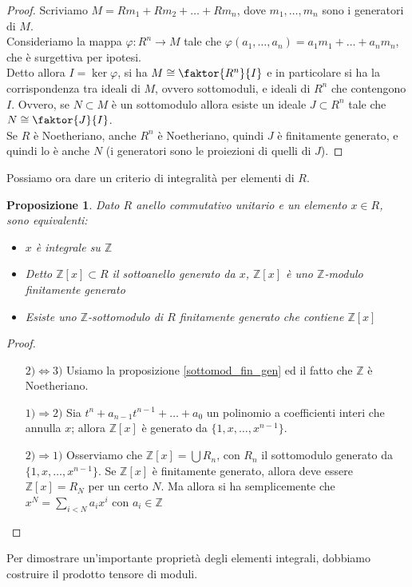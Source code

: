 \documentclass[11pt]{article}
\theoremstyle{plain}
\newtheorem{prop}[thm]{Proposizione}
\theoremstyle{definition}
\theoremstyle{remark}
\newcommand{\Z}{\mathbb{Z}}
\begin{document}
  \begin{proof}
   Scriviamo $M=Rm_1+Rm_2+\dots+Rm_n$, dove $m_1,\dots,m_n$ sono i generatori di $M$.\\
   Consideriamo la mappa $\varphi:R^n\to M$ tale che $\varphi(a_1,\dots,a_n)=a_1m_1+\dots+a_nm_n$, che è surgettiva per ipotesi.\\
   Detto allora $I=\ker\varphi$, si ha $M\cong\faktor{R^n}{I}$ e in particolare si ha la corrispondenza tra ideali di $M$, ovvero sottomoduli, e ideali di $R^n$ che contengono $I$.
   Ovvero, se $N\subset M$ è un sottomodulo allora esiste un ideale $J\subset R^n$ tale che $N\cong\faktor{J}{I}$.\\
   Se $R$ è Noetheriano, anche $R^n$ è Noetheriano, quindi $J$ è finitamente generato, e quindi lo è anche $N$ (i generatori sono le proiezioni di quelli di $J$).
  \end{proof}
  Possiamo ora dare un criterio di integralità per elementi di $R$.
  \begin{prop}\label{crit_integ}
   Dato $R$ anello commutativo unitario e un elemento $x\in R$, sono equivalenti:
   \begin{itemize}
    \item $x$ è integrale su $\Z$
    \item Detto $\Z[x]\subset R$ il sottoanello generato da $x$, $\Z[x]$ è uno $\Z$-modulo finitamente generato
    \item Esiste uno $\Z$-sottomodulo di $R$ finitamente generato che contiene $\Z[x]$
   \end{itemize}
  \end{prop}
  \begin{proof}
   \begin{itemize}
    \item[$2)\iff 3)$] Usiamo la proposizione \ref{sottomod_fin_gen} ed il fatto che $\Z$ è Noetheriano.
    \item[$1)\Rightarrow2)$] Sia $t^n+a_{n-1}t^{n-1}+\dots+a_0$ un polinomio a coefficienti interi che annulla $x$; allora $\Z[x]$ è generato da $\{1,x,\dots,x^{n-1}\}$.
    \item[$2)\Rightarrow1)$] Osserviamo che $\Z[x]=\bigcup R_n$, con $R_n$ il sottomodulo generato da $\{1,x,\dots,x^{n-1}\}$. Se $\Z[x]$ è finitamente generato, allora deve essere $\Z[x]=R_N$ per un certo $N$.
    Ma allora si ha semplicemente che $x^N=\sum_{i<N}a_ix^i$ con $a_i\in\Z$
   \end{itemize}
  \end{proof}
  Per dimostrare un'importante proprietà degli elementi integrali, dobbiamo costruire il prodotto tensore di moduli.\\
\end{document}
